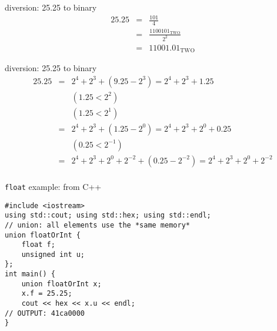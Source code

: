 \begin{frame}{diversion: 25.25 to binary}
\begin{eqnarray*}
    25.25 &=& \frac{101}{4} \\
          &=& \frac{1100101_\text{TWO}}{2^2} \\
          &=& 11001.01_\text{TWO}
\end{eqnarray*}
\end{frame}

\begin{frame}{diversion: 25.25 to binary}
\begin{eqnarray*}
    25.25 &=& 2^4 + 2^3 + (9.25-2^3) = 2^4 + 2^3 + 1.25 \\
          &~& (1.25 < 2^2) \\
          &~& (1.25 < 2^1) \\
          &=& 2^4 + 2^3 + (1.25-2^0) = 2^4 + 2^3 + 2^0 + 0.25 \\
          &~& (0.25 < 2^{-1}) \\
          &=& 2^4 + 2^3 + 2^0 + 2^{-2} + (0.25 - 2^{-2}) = 2^4 + 2^3 + 2^0 + 2^{-2} \\
\end{eqnarray*}
\end{frame}

\begin{frame}[fragile,label=floatUnion]{\texttt{float} example: from C++}
\lstset{
    language=C++,
    style=smaller
}
\begin{lstlisting}
#include <iostream>
using std::cout; using std::hex; using std::endl;
// union: all elements use the *same memory*
union floatOrInt {
    float f;
    unsigned int u;
};
int main() {
    union floatOrInt x;
    x.f = 25.25;
    cout << hex << x.u << endl;
// OUTPUT: 41ca0000
}
\end{lstlisting}
\end{frame}

